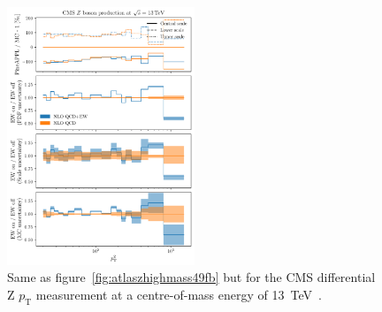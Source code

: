 \begin{figure}[!t]
    \centering
    \includegraphics[width=0.5\textwidth]{figures/pineappl_CMS_Z_13_TEV}
    \caption{Same as figure~\ref{fig:atlaszhighmass49fb} but for the 
      CMS differential Z $p_\mathrm{T}$ measurement at a centre-of-mass energy of
      \SI{13}{\tera\electronvolt}~\cite{Sirunyan:2019bzr}.}
    \label{fig:cmsZ13TeV}
\end{figure}
